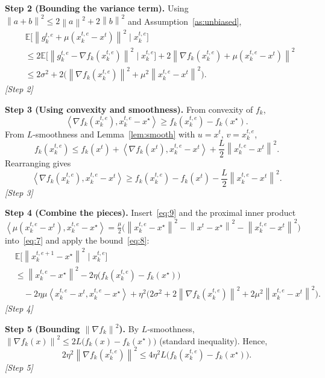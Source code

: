\documentclass[11pt]{article}
\newcommand{\E}{\mathbb{E}}
\newcommand{\norm}[1]{\left\lVert #1\right\rVert}
\newcommand{\ip}[2]{\left\langle #1,#2\right\rangle}
\begin{document}
\noindent\textbf{Step 2 (Bounding the variance term).}  
Using $\norm{a+b}^{2}\le 2\norm{a}^{2}+2\norm{b}^{2}$ and Assumption~\ref{as:unbiased},
\[
\begin{aligned}
&\E\!\big[\norm{g_{k}^{t,e}+\mu(x_{k}^{t,e}-x^{t})}^{2}\mid x_{k}^{t,e}\big]\\
&\le 2\E\!\big[\norm{g_{k}^{t,e}-\nabla f_k(x_{k}^{t,e})}^{2}\mid x_{k}^{t,e}\big]
   +2\norm{\nabla f_k(x_{k}^{t,e})+\mu(x_{k}^{t,e}-x^{t})}^{2}\\
&\le 2\sigma^{2}+2\Big(\norm{\nabla f_k(x_{k}^{t,e})}^{2}
      +\mu^{2}\norm{x_{k}^{t,e}-x^{t}}^{2}\Big).
\end{aligned}
\tag{8}
\]
\hfill\textit{[Step 2]}

\noindent\textbf{Step 3 (Using convexity and smoothness).}  
From convexity of $f_k$,
\[
\ip{\nabla f_k(x_{k}^{t,e})}{x_{k}^{t,e}-x^{\star}}\ge f_k(x_{k}^{t,e})-f_k(x^{\star}).
\tag{9}
\]
From $L$‑smoothness and Lemma~\ref{lem:smooth} with $u=x^{t}$, $v=x_{k}^{t,e}$,
\[
f_k(x_{k}^{t,e})\le f_k(x^{t})+\ip{\nabla f_k(x^{t})}{x_{k}^{t,e}-x^{t}}+\frac{L}{2}\norm{x_{k}^{t,e}-x^{t}}^{2}.
\tag{10}
\]
Rearranging gives
\[
\ip{\nabla f_k(x_{k}^{t,e})}{x_{k}^{t,e}-x^{t}}\ge f_k(x_{k}^{t,e})-f_k(x^{t})-\frac{L}{2}\norm{x_{k}^{t,e}-x^{t}}^{2}.
\tag{11}
\]
\hfill\textit{[Step 3]}

\noindent\textbf{Step 4 (Combine the pieces).}  
Insert~\eqref{eq:9} and the proximal inner product
$\ip{\mu(x_{k}^{t,e}-x^{t})}{x_{k}^{t,e}-x^{\star}}
= \frac{\mu}{2}\big(\norm{x_{k}^{t,e}-x^{\star}}^{2}-\norm{x^{t}-x^{\star}}^{2}
-\norm{x_{k}^{t,e}-x^{t}}^{2}\big)$
into~\eqref{eq:7} and apply the bound~\eqref{eq:8}:
\[
\begin{aligned}
&\E\!\big[\norm{x_{k}^{t,e+1}-x^{\star}}^{2}\mid x_{k}^{t,e}\big]\\
&\le \norm{x_{k}^{t,e}-x^{\star}}^{2}
-2\eta\big(f_k(x_{k}^{t,e})-f_k(x^{\star})\big)\\
&\quad
-2\eta\mu\ip{x_{k}^{t,e}-x^{t}}{x_{k}^{t,e}-x^{\star}}
+\eta^{2}\big(2\sigma^{2}+2\norm{\nabla f_k(x_{k}^{t,e})}^{2}
      +2\mu^{2}\norm{x_{k}^{t,e}-x^{t}}^{2}\big).
\end{aligned}
\tag{12}
\]
\hfill\textit{[Step 4]}

\noindent\textbf{Step 5 (Bounding $\norm{\nabla f_k}^{2}$).}  
By $L$‑smoothness, $\norm{\nabla f_k(x)}^{2}\le 2L\big(f_k(x)-f_k(x^{\star})\big)$ (standard inequality). Hence,
\[
2\eta^{2}\norm{\nabla f_k(x_{k}^{t,e})}^{2}
\le 4\eta^{2}L\big(f_k(x_{k}^{t,e})-f_k(x^{\star})\big).
\tag{13}
\]
\hfill\textit{[Step 5]}
\end{document}
